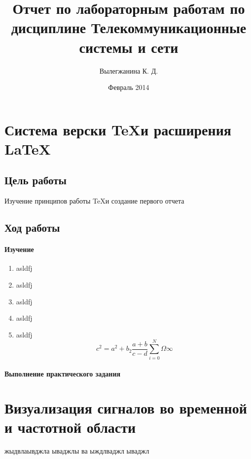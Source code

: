 \documentclass[10pt,a4paper]{article}
\author{Вылегжанина К. Д.}
\title{Отчет по лабораторным работам по дисциплине Телекоммуникационные системы и сети}
\date{Февраль 2014}
\begin{document}
\maketitle
\tableofcontents
\pagebreak
\section{Система верски \TeX и расширения \LaTeX}
\subsection{Цель работы}
Изучение принципов работы \TeX и создание первого отчета
\subsection{Ход работы}
\paragraph{Изучение}
\begin{enumerate}
\item asldfj
\item asldfj
\item asldfj
\item asldfj
\item asldfj
\begin{equation}
c^2 = a^2 + b_2 \frac{a+b}{c-d} \sum_{i=0}^{N} \Omega \infty
\end{equation}
\end{enumerate}

\paragraph{Выполнение практического задания}
\section{Визуализация сигналов во временной и частотной области}
жыдвлаывджла ываджлы ва ыждлваджл ываджл
\end{document}
